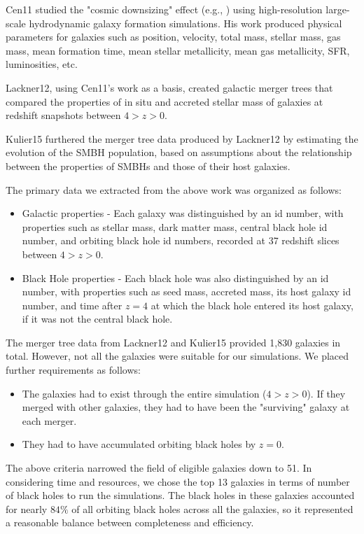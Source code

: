 \documentclass[english, apj]{emulateapj}
\begin{document}
Cen11 studied the "cosmic downsizing" effect (e.g., \citet{1996AJ....112..839C}) using high-resolution large-scale hydrodynamic galaxy formation simulations.  His work produced physical parameters for galaxies such as position, velocity, total mass, stellar mass, gas mass, mean formation time, mean stellar metallicity, mean gas metallicity, SFR, luminosities, etc.

Lackner12, using Cen11's work as a basis, created galactic merger trees that compared the properties of in situ and accreted stellar mass of galaxies at redshift snapshots between $4 > z > 0$.

Kulier15 furthered the merger tree data produced by Lackner12 by estimating the evolution of the SMBH population, based on assumptions about the relationship between the properties of SMBHs and those of their host galaxies.

The primary data we extracted from the above work was organized as follows:
\begin{itemize}
    \item Galactic properties - Each galaxy was distinguished by an id number, with properties such as stellar mass, dark matter mass, central black hole id number, and orbiting black hole id numbers, recorded at 37 redshift slices between $4 > z > 0$.
    \item Black Hole properties - Each black hole was also distinguished by an id number, with properties such as seed mass, accreted mass, its host galaxy id number, and time after $z=4$ at which the black hole entered its host galaxy, if it was not the central black hole.
\end{itemize}

The merger tree data from Lackner12 and Kulier15 provided 1,830 galaxies in total.  However, not all the galaxies were suitable for our simulations.  We placed further requirements as follows:
\begin{itemize}
\item The galaxies had to exist through the entire simulation ($4 > z > 0$).  If they merged with other galaxies, they had to have been the "surviving" galaxy at each merger.
\item They had to have accumulated orbiting black holes by $z = 0$.
\end{itemize}

The above criteria narrowed the field of eligible galaxies down to 51.  In considering time and resources, we chose the top 13 galaxies in terms of number of black holes to run the simulations.  The black holes in these galaxies accounted for nearly $84{\%}$ of all orbiting black holes across all the galaxies, so it represented a reasonable balance between completeness and efficiency.
\end{document}
